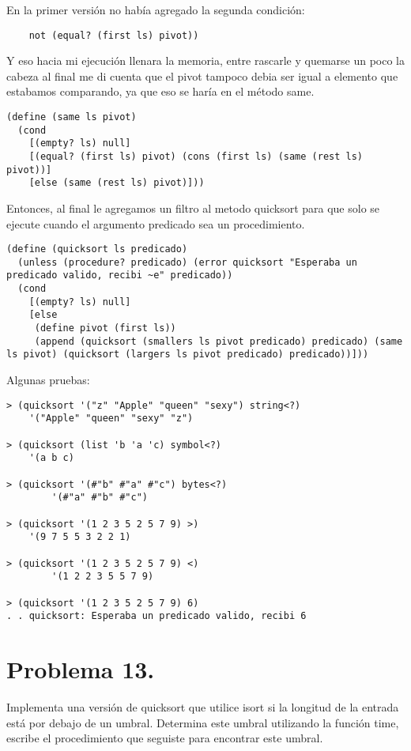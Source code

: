 \documentclass{article}
\begin{document}
En la primer versión no había agregado la segunda condición:

\begin{lstlisting}
    not (equal? (first ls) pivot))
\end{lstlisting}

Y eso hacia mi ejecución llenara la memoria, entre rascarle y quemarse un poco la cabeza al final me di cuenta que el pivot tampoco debia ser igual a elemento que estabamos comparando, ya que eso se haría en el método same.

\begin{lstlisting}
(define (same ls pivot)
  (cond
    [(empty? ls) null]
    [(equal? (first ls) pivot) (cons (first ls) (same (rest ls) pivot))]
    [else (same (rest ls) pivot)]))
\end{lstlisting}

Entonces, al final le agregamos un filtro al metodo quicksort para que solo se ejecute cuando el argumento predicado sea un procedimiento.

\begin{lstlisting}
(define (quicksort ls predicado)
  (unless (procedure? predicado) (error quicksort "Esperaba un predicado valido, recibi ~e" predicado))
  (cond
    [(empty? ls) null]
    [else
     (define pivot (first ls))
     (append (quicksort (smallers ls pivot predicado) predicado) (same ls pivot) (quicksort (largers ls pivot predicado) predicado))]))
\end{lstlisting}

Algunas pruebas:

\begin{lstlisting}
> (quicksort '("z" "Apple" "queen" "sexy") string<?)
	'("Apple" "queen" "sexy" "z")

> (quicksort (list 'b 'a 'c) symbol<?)
	'(a b c)

> (quicksort '(#"b" #"a" #"c") bytes<?)
		'(#"a" #"b" #"c")

> (quicksort '(1 2 3 5 2 5 7 9) >)
	'(9 7 5 5 3 2 2 1)

> (quicksort '(1 2 3 5 2 5 7 9) <)
		'(1 2 2 3 5 5 7 9)

> (quicksort '(1 2 3 5 2 5 7 9) 6)
. . quicksort: Esperaba un predicado valido, recibi 6
\end{lstlisting}

\section*{Problema 13.}
Implementa una versión de quicksort que utilice isort si la longitud de la entrada está
por debajo de un umbral. Determina este umbral utilizando la función time, escribe el procedimiento
que seguiste para encontrar este umbral.
\end{document}
